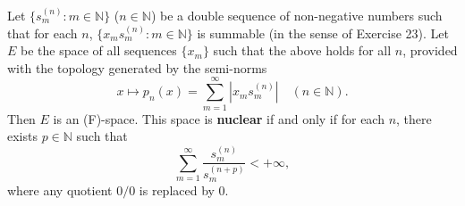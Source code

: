 Let $\{s_m^{(n)} : m \in \mathbb{N}\}$ ($n \in \mathbb{N}$) be a double sequence of non-negative numbers such that for each $n$, $\{x_m s_m^{(n)} : m \in \mathbb{N}\}$ is summable (in the sense of Exercise 23). Let $E$ be the space of all sequences $\{x_m\}$ such that the above holds for all $n$, provided with the topology generated by the semi-norms
$$
x \mapsto p_n(x) = \sum_{m=1}^{\infty} |x_m s_m^{(n)}| \quad (n \in \mathbb{N}).
$$
Then $E$ is an (F)-space. This space is \textbf{nuclear} if and only if for each $n$, there exists $p \in \mathbb{N}$ such that
$$
\sum_{m=1}^{\infty} \frac{s_m^{(n)}}{s_m^{(n+p)}} < +\infty,
$$
where any quotient $0/0$ is replaced by $0$.
